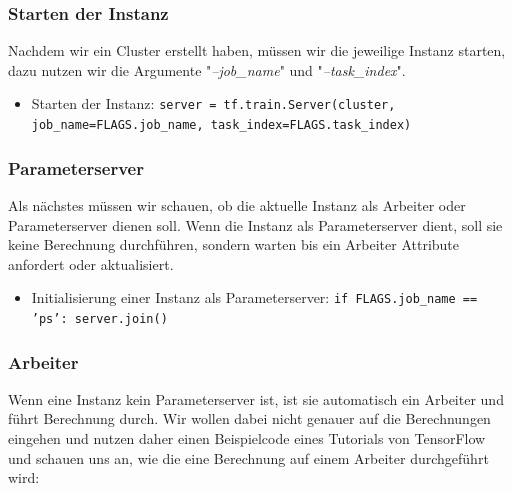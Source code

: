 \vspace{2mm}
\subsubsection{Starten der Instanz}
Nachdem wir ein Cluster erstellt haben, müssen wir die jeweilige Instanz starten, dazu nutzen wir die Argumente "\textit{--job\_name}" und "\textit{--task\_index}".
\begin{itemize}
	\item Starten der Instanz: \newline
		\texttt{server = tf.train.Server(cluster,
				job\_name=FLAGS.job\_name,	
				task\_index=FLAGS.task\_index)}
\end{itemize}

\vspace{2mm}
\subsubsection{Parameterserver}
Als nächstes müssen wir schauen, ob die aktuelle Instanz als Arbeiter oder Parameterserver dienen soll. Wenn die Instanz als Parameterserver dient, soll sie keine Berechnung durchführen, sondern warten bis ein Arbeiter Attribute anfordert oder aktualisiert.
\begin{itemize}
	\item Initialisierung einer Instanz als Parameterserver: \newline
		\texttt{if FLAGS.job\_name == 'ps': 
			server.join()}
\end{itemize}

\vspace{2mm}
\subsubsection{Arbeiter}
Wenn eine Instanz kein Parameterserver ist, ist sie automatisch ein Arbeiter und führt Berechnung durch. Wir wollen dabei nicht genauer auf die Berechnungen eingehen und nutzen daher einen Beispielcode eines Tutorials von TensorFlow und schauen uns an, wie die eine Berechnung auf einem Arbeiter durchgeführt wird:

